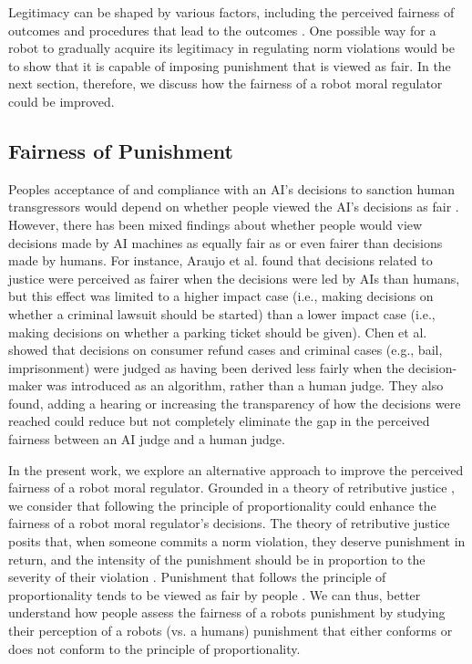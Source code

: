 \documentclass{article} %
\begin{document}
Legitimacy can be shaped by various factors, including the perceived fairness of outcomes and procedures that lead to the outcomes \cite{tyler2021people}. One possible way for a robot to gradually acquire its legitimacy in regulating norm violations would be to show that it is capable of imposing punishment that is viewed as fair. In the next section, therefore, we discuss how the fairness of a robot moral regulator could be improved.

\subsection{Fairness of Punishment}
Peoples acceptance of and compliance with an AI's decisions to sanction human transgressors would depend on whether people viewed the AI's decisions as fair \cite{volokh2018chief,chen2021having}. However, there has been mixed findings about whether people would view decisions made by AI machines as equally fair as or even fairer than decisions made by humans. For instance, Araujo et al.  found that decisions related to justice were perceived as fairer when the decisions were led by AIs than humans, but this effect was limited to a higher impact case (i.e., making decisions on whether a criminal lawsuit should be started) than a lower impact case (i.e., making decisions on whether a parking ticket should be given). Chen et al.  showed that decisions on consumer refund cases and criminal cases (e.g., bail, imprisonment) were judged as having been derived less fairly when the decision-maker was introduced as an algorithm, rather than a human judge. They also found, adding a hearing or increasing the transparency of how the decisions were reached could reduce but not completely eliminate the gap in the perceived fairness between an AI judge and a human judge.

In the present work, we explore an alternative approach to improve the perceived fairness of a robot moral regulator. Grounded in a theory of retributive justice \cite{darley2003psychology,sep-justice-retributive}, we consider that following the principle of proportionality could enhance the fairness of a robot moral regulator's decisions. The theory of retributive justice posits that, when someone commits a norm violation, they deserve punishment in return, and the intensity of the punishment should be in proportion to the severity of their violation \cite{darley2003psychology,sep-justice-retributive}. Punishment that follows the principle of proportionality tends to be viewed as fair by people \cite{miller1981social,hogan1981retributive,ball1994just}. We can thus, better understand how people assess the fairness of a robots punishment by studying their perception of a robots (vs. a humans) punishment that either conforms or does not conform to the principle of proportionality.
\end{document}
